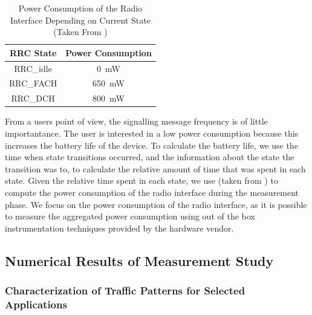 \begin{table}
  \centering
  \begin{tabular}{cc}
  	\toprule
    \gls{RRC} State & Power Consumption\\
    \midrule
    \gls{RRC_idle} & \SI{0}{\milli\watt}\\
    \gls{RRC_FACH} & \SI{650}{\milli\watt}\\
    \gls{RRC_DCH} & \SI{800}{\milli\watt}\\
    \bottomrule
  \end{tabular}
  \caption{Power Consumption of the  Radio Interface Depending on Current  State (Taken From \cite{Qian2011})}
  \label{tab:network:network_traces:calculating_metrics:power_consumption}	
\end{table}

From a users point of view, the signalling message frequency is of little importantance.
The user is interested in a low power consumption because this increases the battery life of the device.
To calculate the battery life, we use the time when state transitions occurred, and the information about the state the transition was to, to calculate the relative amount of time that was spent in each state.
Given the relative time spent in each state, we use  (taken from \cite{Qian2011}) to compute the power consumption of the radio interface during the measurement phase.
We focus on the power consumption of the radio interface, as it is possible to measure the aggregated power consumption using out of the box instrumentation techniques provided by the hardware vendor.

\subsection{Numerical Results of Measurement Study}\label{sec:network:network_traces:numerical_results}

\subsubsection*{Characterization of Traffic Patterns for Selected Applications}\label{sec:network:network_traces:numerical_results:traffic_characterization}

